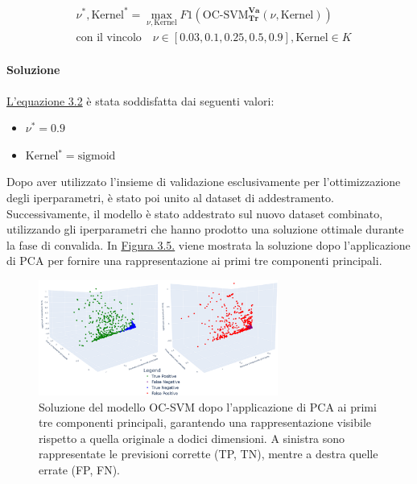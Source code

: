     \begin{equation}
        \label{eq:ocsvm-problem}
        \begin{aligned}
            & \nu^*, \text{Kernel}^* = \max_{\nu, \text{Kernel}} F1(\text{OC-SVM}_\mathbf{Tr}^\mathbf{Va}(\nu, \text{Kernel})) \\
            & \text{con il vincolo} \quad \nu \in [0.03, 0.1, 0.25, 0.5, 0.9], \text{Kernel} \in K
        \end{aligned}
    \end{equation}
        
        \paragraph{Soluzione} \hyperref[eq:ocsvm-problem]{L'equazione 3.2}  è stata soddisfatta dai seguenti valori:
        \begin{itemize}
            \item $\nu^* = 0.9$
            \item Kernel$^* = \text{sigmoid}$
        \end{itemize}

        Dopo aver utilizzato l'insieme di validazione esclusivamente per l'ottimizzazione degli iperparametri, 
        è stato poi unito al dataset di addestramento. Successivamente, il modello è stato addestrato sul nuovo
        dataset combinato, utilizzando gli iperparametri che hanno prodotto una soluzione ottimale durante la fase di 
        convalida. In \hyperref[fig:ocsvm-sol]{Figura 3.5.} viene mostrata la 
        soluzione dopo l'applicazione di PCA per fornire una rappresentazione ai primi tre componenti principali.
        
        \begin{figure}[H]
            \centering
            \includegraphics[width=0.7\textwidth]{./input/chapters/models/figs/ocsvm-sol.png}
            \caption{\small
                Soluzione del modello OC-SVM dopo l'applicazione di PCA ai primi tre 
                componenti principali, garantendo una rappresentazione visibile rispetto a quella 
                originale a dodici dimensioni. A sinistra sono rappresentate le previsioni corrette
                (TP, TN), mentre a destra quelle errate (FP, FN).
            }
            \label{fig:ocsvm-sol}
        \end{figure}

